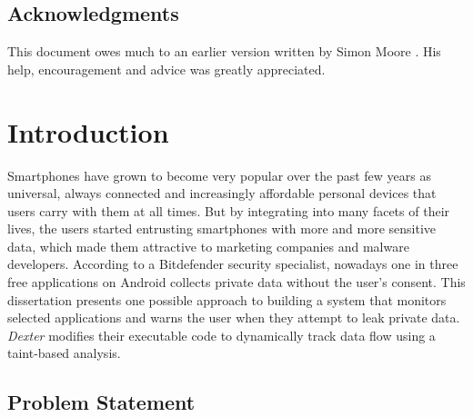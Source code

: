 \documentclass[12pt,twoside,notitlepage]{report}
\begin{document}
\cleardoublepage

\tableofcontents

\listoffigures

\newpage
\section*{Acknowledgments}

This document owes much to an earlier version written by Simon Moore
\cite{moore95}.  His help, encouragement and advice was greatly 
appreciated.


\cleardoublepage        %

\setcounter{page}{1}
\pagestyle{headings}

\chapter{Introduction}

Smartphones have grown to become very popular over the past few years as universal, always connected and increasingly affordable personal devices that users carry with them at all times. But by integrating into many facets of their lives, the users started entrusting smartphones with more and more sensitive data, which made them attractive to marketing companies and malware developers. According to a Bitdefender security specialist, nowadays one in three free applications on Android collects private data without the user's consent\cite{web:HuffingtonOneInThree}. This dissertation presents one possible approach to building a system that monitors selected applications and warns the user when they attempt to leak private data. \emph{Dexter} modifies their executable code to dynamically track data flow using a taint-based analysis.

\section{Problem Statement}
\end{document}
